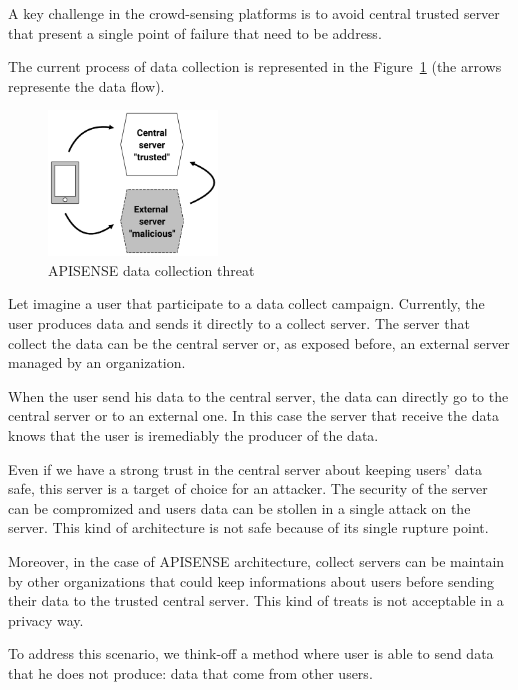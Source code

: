 A key challenge in the crowd-sensing platforms is to avoid central trusted server that present a single point of failure that need to be address.

The current process of data collection is represented in the Figure~\ref{Threat} (the arrows represente the data flow).

\begin{figure}[h]
    \centering
    \includegraphics[width=0.4\textwidth]{figures/threat}
    \caption{\label{Threat} APISENSE data collection threat}
\end{figure}


Let imagine a user that participate to a data collect campaign.
Currently, the user produces data and sends it directly to a collect server.
The server that collect the data can be the central server or, as exposed before, an external server managed by an organization.

When the user send his data to the central server, the data can directly go to the central server or to an external one.
In this case the server that receive the data knows that the user is iremediably the producer of the data.

Even if we have a strong trust in the central server about keeping users' data safe, this server is a target of choice for an attacker.
The security of the server can be compromized and users data can be stollen in a single attack on the server.
This kind of architecture is not safe because of its single rupture point.

Moreover, in the case of APISENSE architecture, collect servers can be maintain by other organizations that could keep informations about users before sending their data to the trusted central server.
This kind of treats is not acceptable in a privacy way.

To address this scenario, we think-off a method where user is able to send data that he does not produce: data that come from other users.



